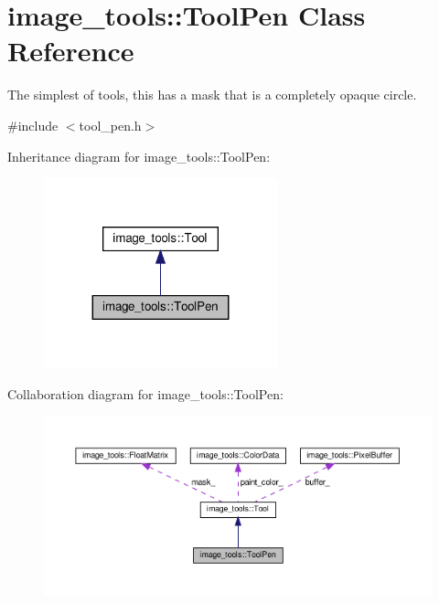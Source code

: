 \hypertarget{classimage__tools_1_1ToolPen}{}\section{image\+\_\+tools\+:\+:Tool\+Pen Class Reference}
\label{classimage__tools_1_1ToolPen}


The simplest of tools, this has a mask that is a completely opaque circle.  




{\ttfamily \#include $<$tool\+\_\+pen.\+h$>$}



Inheritance diagram for image\+\_\+tools\+:\+:Tool\+Pen\+:
\nopagebreak
\begin{figure}[H]
\begin{center}
\leavevmode
\includegraphics[width=191pt]{classimage__tools_1_1ToolPen__inherit__graph}
\end{center}
\end{figure}


Collaboration diagram for image\+\_\+tools\+:\+:Tool\+Pen\+:
\nopagebreak
\begin{figure}[H]
\begin{center}
\leavevmode
\includegraphics[width=350pt]{classimage__tools_1_1ToolPen__coll__graph}
\end{center}
\end{figure}

